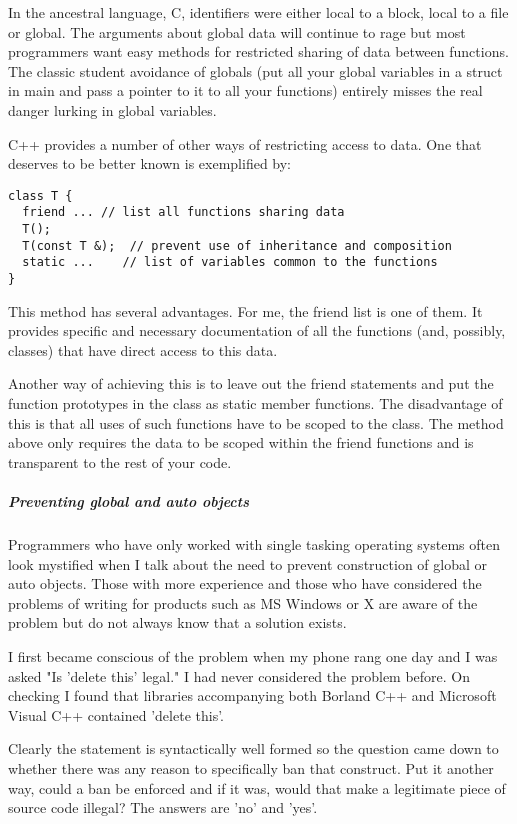 \documentclass{book}
\begin{document}
In the ancestral language, C, identifiers were either local to a block, local to a file or global. 
The arguments about global data will continue to rage but most programmers want easy methods for restricted sharing of data between functions.
The classic student avoidance of globals (put all your global variables in a struct in main and pass a pointer to it to all your functions) entirely misses the real danger lurking in global variables.

C++ provides a number of other ways of restricting access to data. One that deserves to be better known is exemplified by:
\begin{lstlisting}
class T {
  friend ... // list all functions sharing data
  T();
  T(const T &);  // prevent use of inheritance and composition
  static ...    // list of variables common to the functions 
}
\end{lstlisting}

This method has several advantages. 
For me, the friend list is one of them. 
It provides specific and necessary documentation of all the functions (and, possibly, classes) that have direct access to this data.

Another way of achieving this is to leave out the friend statements and put the function prototypes in the class as static member functions.
The disadvantage of this is that all uses of such functions have to be scoped to the class.
The method above only requires the data to be scoped within the friend functions and is transparent to the rest of your code.

\subparagraph{Preventing global and auto objects}

Programmers who have only worked with single tasking operating systems often look mystified when I talk about the need to prevent construction of global or auto objects.
Those with more experience and those who have considered the problems of writing for products such as MS Windows or X are aware of the problem but do not always know that a solution exists.

I first became conscious of the problem when my phone rang one day and I was asked "Is 'delete this' legal." I had never considered the problem before.
On checking I found that libraries accompanying both Borland C++ and Microsoft Visual C++ contained 'delete this'.

Clearly the statement is syntactically well formed so the question came down to whether there was any reason to specifically ban that construct.
Put it another way, could a ban be enforced and if it was, would that make a legitimate piece of source code illegal? The answers are 'no' and 'yes'.
\end{document}
